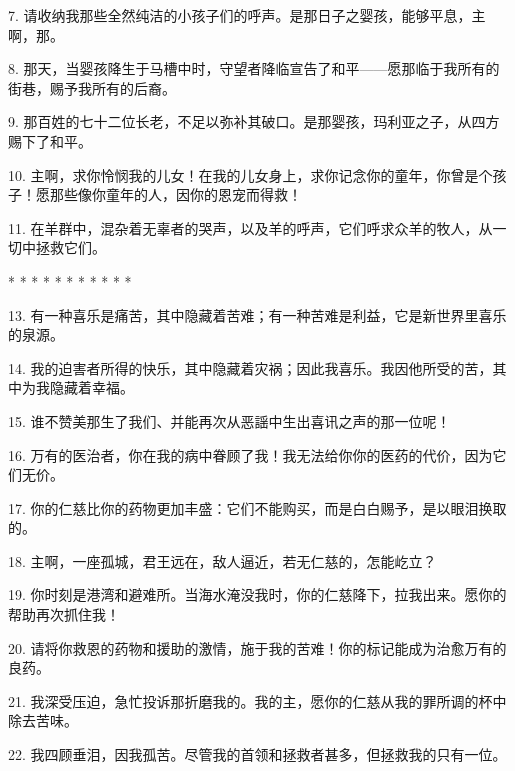 7. 请收纳我那些全然纯洁的小孩子们的呼声。是那日子之婴孩，能够平息，主啊，那。\par

8. 那天，当婴孩降生于马槽中时，守望者降临宣告了和平——愿那临于我所有的街巷，赐予我所有的后裔。\par

9. 那百姓的七十二位长老，不足以弥补其破口。是那婴孩，玛利亚之子，从四方赐下了和平。\par

10. 主啊，求你怜悯我的儿女！在我的儿女身上，求你记念你的童年，你曾是个孩子！愿那些像你童年的人，因你的恩宠而得救！\par

11. 在羊群中，混杂着无辜者的哭声，以及羊的呼声，它们呼求众羊的牧人，从一切中拯救它们。\par

* * * * * * * * * * *\par

13. 有一种喜乐是痛苦，其中隐藏着苦难；有一种苦难是利益，它是新世界里喜乐的泉源。\par

14. 我的迫害者所得的快乐，其中隐藏着灾祸；因此我喜乐。我因他所受的苦，其中为我隐藏着幸福。\par

15. 谁不赞美那生了我们、并能再次从恶謡中生出喜讯之声的那一位呢！\par

16. 万有的医治者，你在我的病中眷顾了我！我无法给你你的医药的代价，因为它们无价。\par

17. 你的仁慈比你的药物更加丰盛：它们不能购买，而是白白赐予，是以眼泪换取的。\par

18. 主啊，一座孤城，君王远在，敌人逼近，若无仁慈的，怎能屹立？\par

19. 你时刻是港湾和避难所。当海水淹没我时，你的仁慈降下，拉我出来。愿你的帮助再次抓住我！\par

20. 请将你救恩的药物和援助的激情，施于我的苦难！你的标记能成为治愈万有的良药。\par

21. 我深受压迫，急忙投诉那折磨我的。我的主，愿你的仁慈从我的罪所调的杯中除去苦味。\par

22. 我四顾垂泪，因我孤苦。尽管我的首领和拯救者甚多，但拯救我的只有一位。\par

